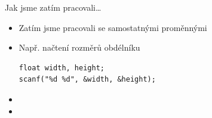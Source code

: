 \documentclass[14pt,aspectratio=169]{beamer}
\author{\authorname}
\begin{document}

    \begin{frame}
        \titlepage
    \end{frame}

    \begin{frame}[t,fragile]{Jak jsme zatím pracovali\dots}
        \begin{itemize}
            \item Zatím jsme pracovali se samostatnými proměnnými
            \item Např. načtení rozměrů obdélníku
            \begin{lstlisting}
float width, height;
scanf("%d %d", &width, &height);
            \end{lstlisting}
            \item {} 
            \item {} 
        \end{itemize}
    \end{frame}
\end{document}
